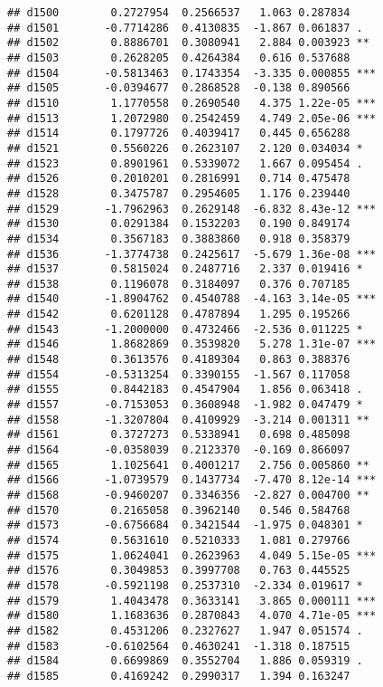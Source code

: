 \documentclass[
]{article}
\begin{document}
\begin{verbatim}
## d1500        0.2727954  0.2566537   1.063 0.287834    
## d1501       -0.7714286  0.4130835  -1.867 0.061837 .  
## d1502        0.8886701  0.3080941   2.884 0.003923 ** 
## d1503        0.2628205  0.4264384   0.616 0.537688    
## d1504       -0.5813463  0.1743354  -3.335 0.000855 ***
## d1505       -0.0394677  0.2868528  -0.138 0.890566    
## d1510        1.1770558  0.2690540   4.375 1.22e-05 ***
## d1513        1.2072980  0.2542459   4.749 2.05e-06 ***
## d1514        0.1797726  0.4039417   0.445 0.656288    
## d1521        0.5560226  0.2623107   2.120 0.034034 *  
## d1523        0.8901961  0.5339072   1.667 0.095454 .  
## d1526        0.2010201  0.2816991   0.714 0.475478    
## d1528        0.3475787  0.2954605   1.176 0.239440    
## d1529       -1.7962963  0.2629148  -6.832 8.43e-12 ***
## d1530        0.0291384  0.1532203   0.190 0.849174    
## d1534        0.3567183  0.3883860   0.918 0.358379    
## d1536       -1.3774738  0.2425617  -5.679 1.36e-08 ***
## d1537        0.5815024  0.2487716   2.337 0.019416 *  
## d1538        0.1196078  0.3184097   0.376 0.707185    
## d1540       -1.8904762  0.4540788  -4.163 3.14e-05 ***
## d1542        0.6201128  0.4787894   1.295 0.195266    
## d1543       -1.2000000  0.4732466  -2.536 0.011225 *  
## d1546        1.8682869  0.3539820   5.278 1.31e-07 ***
## d1548        0.3613576  0.4189304   0.863 0.388376    
## d1554       -0.5313254  0.3390155  -1.567 0.117058    
## d1555        0.8442183  0.4547904   1.856 0.063418 .  
## d1557       -0.7153053  0.3608948  -1.982 0.047479 *  
## d1558       -1.3207804  0.4109929  -3.214 0.001311 ** 
## d1561        0.3727273  0.5338941   0.698 0.485098    
## d1564       -0.0358039  0.2123370  -0.169 0.866097    
## d1565        1.1025641  0.4001217   2.756 0.005860 ** 
## d1566       -1.0739579  0.1437734  -7.470 8.12e-14 ***
## d1568       -0.9460207  0.3346356  -2.827 0.004700 ** 
## d1570        0.2165058  0.3962140   0.546 0.584768    
## d1573       -0.6756684  0.3421544  -1.975 0.048301 *  
## d1574        0.5631610  0.5210333   1.081 0.279766    
## d1575        1.0624041  0.2623963   4.049 5.15e-05 ***
## d1576        0.3049853  0.3997708   0.763 0.445525    
## d1578       -0.5921198  0.2537310  -2.334 0.019617 *  
## d1579        1.4043478  0.3633141   3.865 0.000111 ***
## d1580        1.1683636  0.2870843   4.070 4.71e-05 ***
## d1582        0.4531206  0.2327627   1.947 0.051574 .  
## d1583       -0.6102564  0.4630241  -1.318 0.187515    
## d1584        0.6699869  0.3552704   1.886 0.059319 .  
## d1585        0.4169242  0.2990317   1.394 0.163247    

\end{verbatim}
\end{document}
